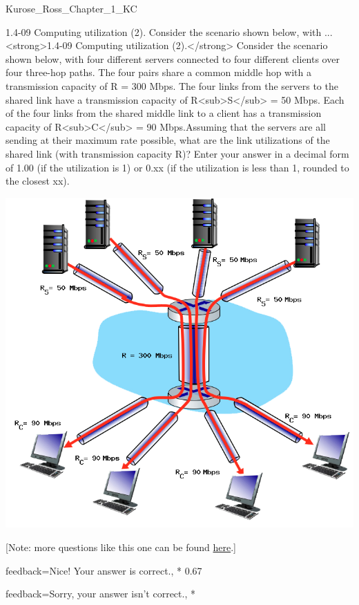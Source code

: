 \documentclass[a4paper]{article}
\begin{document}
\begin{quiz}{Kurose_Ross_Chapter_1_KC}
\begin{shortanswer}[
	points=1,
	penalty=0.33333,
]{1.4-09 Computing utilization (2). Consider the scenario shown below, with ...}
<strong>1.4-09 Computing utilization (2).</strong> Consider the scenario shown below, with four different servers connected to four different clients over four three-hop paths. The four pairs share a common middle hop with a transmission capacity of R = 300 Mbps. The four links from the servers to the shared link have a transmission capacity of R<sub>S</sub> = 50 Mbps. Each of the four links from the shared middle link to a client has a transmission capacity of R<sub>C</sub> = 90 Mbps.Assuming that the servers are all sending at their maximum rate possible, what are the link utilizations of the shared link (with transmission capacity R)? Enter your answer in a decimal form of 1.00 (if the utilization is 1) or 0.xx (if the utilization is less than 1, rounded to the closest xx). 
\begin{center}
\includegraphics[width=\linewidth]{figs/1.4.7.png}
\end{center}
 [Note: more questions like this one can be found \href{http://gaia.cs.umass.edu/kurose_ross/interactive/end-end-throughput-simple.php}{here}.]
\item[feedback={Nice!  Your answer is correct.},]* 0.67
\item[feedback={Sorry, your answer isn't correct.},] *
\end{shortanswer}


\end{quiz}
\end{document}
